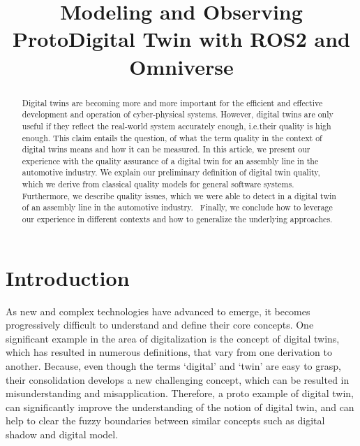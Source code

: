 \documentclass[conference]{IEEEtran}
\begin{document}
    \title{Modeling and Observing ProtoDigital Twin with ROS2 and Omniverse}
    \author{ 
    \and 
    }
   
    \maketitle

    \begin{abstract}
        Digital twins are becoming more and more important for the efficient and effective development and operation of cyber-physical systems.
        However, digital twins are only useful if they reflect the real-world system accurately enough, i.e.their quality is high enough. 
        This claim entails the question, of what the term quality in the context of digital twins means and how it can be measured. 
        In this article, we present our experience with the quality assurance of a digital twin for an assembly line in the automotive industry.
        We explain our preliminary definition of digital twin quality, which we derive from classical quality models for general software systems. 
        Furthermore, we describe quality issues, which we were able to detect in a digital twin of an assembly line in the automotive industry. \
        Finally, we conclude how to leverage our experience in different contexts and how to generalize the underlying approaches.
    \end{abstract}

    \section{Introduction}\label{section:introduction}
    As new and complex technologies have advanced to emerge, it becomes progressively 
    difficult to understand and define their core concepts. One significant example in the 
    area of digitalization is the concept of digital twins, which has resulted in numerous definitions, that vary 
    from one derivation to another. Because, even though the terms `digital' and `twin' are easy to grasp,  their 
    consolidation develops a new challenging concept, which can be resulted in misunderstanding and misapplication. 
    Therefore, a proto example of digital twin, can significantly improve the understanding 
    of the notion of digital twin, and can help to clear the fuzzy boundaries between similar concepts such as digital shadow and digital model.
    
\end{document}
